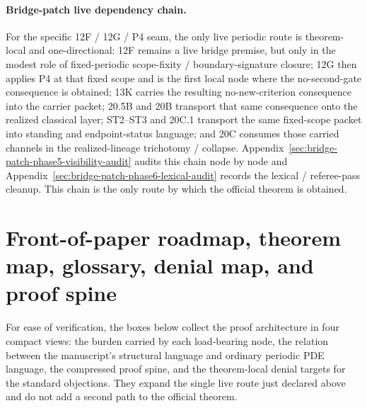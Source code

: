 \paragraph{Bridge-patch live dependency chain.}
For the specific 12F / 12G / P4 seam, the only live periodic route is theorem-local and one-directional: 12F remains a live bridge premise, but only in the modest role of fixed-periodic scope-fixity / boundary-signature closure; 12G then applies P4 at that fixed scope and is the first local node where the no-second-gate consequence is obtained; 13K carries the resulting no-new-criterion consequence into the carrier packet; 20.5B and 20B transport that same consequence onto the realized classical layer; ST2--ST3 and 20C.1 transport the same fixed-scope packet into standing and endpoint-status language; and 20C consumes those carried channels in the realized-lineage trichotomy / collapse. Appendix~\ref{sec:bridge-patch-phase5-visibility-audit} audits this chain node by node and Appendix~\ref{sec:bridge-patch-phase6-lexical-audit} records the lexical / referee-pass cleanup. This chain is the only route by which the official theorem is obtained.

\section*{Front-of-paper roadmap, theorem map, glossary, denial map, and proof spine}
For ease of verification, the boxes below collect the proof architecture in four compact views: the burden carried by each load-bearing node, the relation between the manuscript's structural language and ordinary periodic PDE language, the compressed proof spine, and the theorem-local denial targets for the standard objections. They expand the single live route just declared above and do not add a second path to the official theorem.

